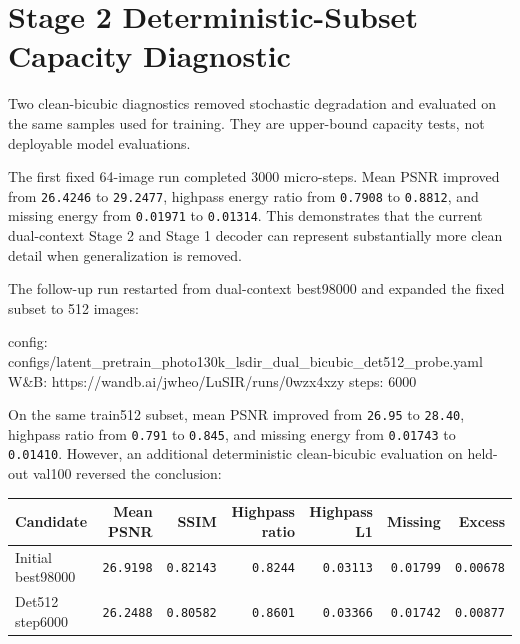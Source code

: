 \documentclass[
  10pt,
]{article}
\newenvironment{Shaded}{}{}
\newcommand{\NormalTok}[1]{#1}
\begin{document}
\hypertarget{stage-2-deterministic-subset-capacity-diagnostic}{%
\section{Stage 2 Deterministic-Subset Capacity
Diagnostic}\label{stage-2-deterministic-subset-capacity-diagnostic}}

Two clean-bicubic diagnostics removed stochastic degradation and
evaluated on the same samples used for training. They are upper-bound
capacity tests, not deployable model evaluations.

The first fixed 64-image run completed 3000 micro-steps. Mean PSNR
improved from \texttt{26.4246} to \texttt{29.2477}, highpass energy
ratio from \texttt{0.7908} to \texttt{0.8812}, and missing energy from
\texttt{0.01971} to \texttt{0.01314}. This demonstrates that the current
dual-context Stage 2 and Stage 1 decoder can represent substantially
more clean detail when generalization is removed.

The follow-up run restarted from dual-context best98000 and expanded the
fixed subset to 512 images:

\begin{Shaded}
\begin{Highlighting}[]
\NormalTok{config: configs/latent\_pretrain\_photo130k\_lsdir\_dual\_bicubic\_det512\_probe.yaml}
\NormalTok{W\&B:   https://wandb.ai/jwheo/LuSIR/runs/0wzx4xzy}
\NormalTok{steps: 6000}
\end{Highlighting}
\end{Shaded}

On the same train512 subset, mean PSNR improved from \texttt{26.95} to
\texttt{28.40}, highpass ratio from \texttt{0.791} to \texttt{0.845},
and missing energy from \texttt{0.01743} to \texttt{0.01410}. However,
an additional deterministic clean-bicubic evaluation on held-out val100
reversed the conclusion:

\begin{longtable}[]{@{}lrrrrrr@{}}
\toprule\noalign{}
Candidate & Mean PSNR & SSIM & Highpass ratio & Highpass L1 & Missing &
Excess \\
\midrule\noalign{}
\endhead
\bottomrule\noalign{}
\endlastfoot
Initial best98000 & \texttt{26.9198} & \texttt{0.82143} &
\texttt{0.8244} & \texttt{0.03113} & \texttt{0.01799} &
\texttt{0.00678} \\
Det512 step6000 & \texttt{26.2488} & \texttt{0.80582} & \texttt{0.8601}
& \texttt{0.03366} & \texttt{0.01742} & \texttt{0.00877} \\
\end{longtable}
\end{document}
